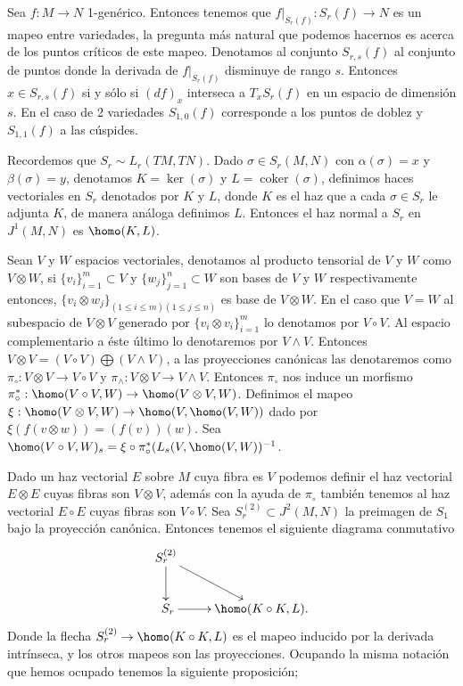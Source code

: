 \documentclass{report}
\theoremstyle{definition}
\DeclareMathOperator{\cok}{coker}
\let\hom\homo
\DeclareMathOperator{\hom}{Hom}
\begin{document}
Sea $f:M \to N$ 1-gen\'erico. Entonces tenemos que $f \vert_{S_r (f)}: S_r (f) \to N$ es un mapeo entre variedades, la pregunta m\'as natural que podemos hacernos es acerca de los puntos cr\'iticos de este mapeo. Denotamos al conjunto $S_{r,s} (f)$ al conjunto de puntos donde la derivada de $f \vert_{S_r (f)}$ disminuye de rango $s$. Entonces $x \in S_{r,s} (f)$ si y s\'olo si $(df)_x$ interseca a $T_x S_r (f)$ en un espacio de dimensi\'on $s$. En el caso de 2 variedades $S_{1,0}(f)$ corresponde a los puntos de doblez y $S_{1,1} (f)$ a las c\'uspides.

Recordemos que $S_r \sim L_r (TM, TN)$. Dado $\sigma \in S_r (M,N)$ con $\alpha(\sigma) = x$ y $\beta(\sigma) = y$, denotamos $K = \ker(\sigma) $ y $L= \cok (\sigma)$, definimos haces vectoriales en $S_r$ denotados por $K$ y $L$, donde $K$ es el haz que a cada $\sigma \in S_r$ le adjunta $K$, de manera an\'aloga definimos $L$. Entonces el haz normal a $S_r$ en $J^1(M,N)$ es  $\hom(K,L)$. 

Sean $V$ y $W$ espacios vectoriales, denotamos al producto tensorial de $V$ y $W$ como $V \otimes W$, si $\{ v_i \}_{i=1}^m \subset V$ y $\{ w_j \}_{j=1}^n \subset W$ son bases de $V$ y $W$ respectivamente entonces, $\{ v_i \otimes w_j \}_{(1 \leq i \leq m)(1 \leq j \leq n)}$ es base de $V \otimes W$. En el caso que $V = W$ al subespacio de $V \otimes V$ generado por $\{ v_i \otimes v_i \}_{i=1}^m$ lo denotamos por $V \circ V$. Al espacio complementario a \'este \'ultimo lo denotaremos por $V \wedge V$. Entonces $V \otimes V = (V \circ V) \bigoplus (V \wedge V)$, a las proyecciones can\'onicas las denotaremos como $\pi_\circ :V \otimes V \to V \circ V$ y $\pi_\wedge : V \otimes V \to V \wedge V$. Entonces $\pi_\circ$ nos induce un morfismo $\pi_\circ^\ast: \hom (V \circ V , W) \to \hom (V \otimes V , W)$. Definimos el mapeo $\xi: \hom(V \otimes V , W) \to \hom(V , \hom (V,W))$ dado por $\xi (f(v \otimes w)) = (f(v))(w)$. Sea $\hom (V \circ V, W)_s  = \xi \circ \pi_\circ^\ast (L_s(V,\hom (V,W))^{-1}$.

Dado un haz vectorial $E$ sobre $M$ cuya fibra es $V$ podemos definir el haz vectorial $E \otimes E$ cuyas fibras son $V \otimes V$, adem\'as con la ayuda de $\pi_\circ$ tambi\'en tenemos al haz vectorial $E \circ E$ cuyas fibras son $V \circ V$. Sea $S_r^{(2)} \subset J^2(M,N)$ la preimagen de $S_1$ bajo la proyecci\'on can\'onica. Entonces tenemos el siguiente diagrama conmutativo $$ \xymatrix{
 \ar[d] S_r^{(2)} \ar[dr]\\\
S_r  \ar[r] & \hom(K \circ K , L) .}$$
Donde la flecha $S_r^{(2)} \to \hom (K \circ K,L)$ es el mapeo inducido por la derivada intr\'inseca, y los otros mapeos son las proyecciones. Ocupando la misma notaci\'on que hemos ocupado tenemos la siguiente proposici\'on;
\end{document}
